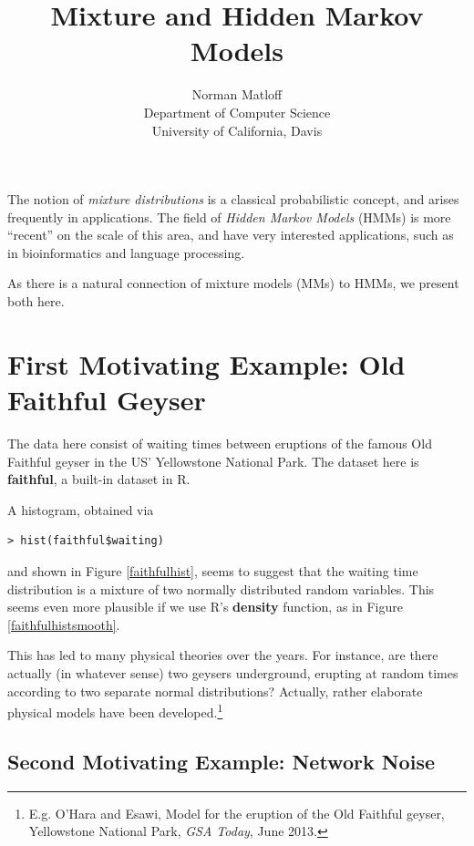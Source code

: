 \documentclass[11pt]{article}
\begin{document}
 

\title{Mixture and Hidden Markov Models}
\author{Norman Matloff \\
   Department of Computer Science \\
   University of California, Davis}

\maketitle

The notion of \textit{mixture distributions} is a classical
probabilistic concept, and arises frequently in applications.  The field
of \textit{Hidden Markov Models} (HMMs) is more ``recent'' on the scale
of this area, and have very interested applications, such as in
bioinformatics and language processing.

As there is a natural connection of mixture models (MMs) to HMMs, we
present both here.  

\section{First Motivating Example:  Old Faithful Geyser}

The data here consist of waiting times between eruptions of the famous
Old Faithful geyser in the US' Yellowstone National Park.  The dataset
here is \textbf{faithful}, a built-in dataset in R.

A histogram, obtained via 

\begin{lstlisting}
> hist(faithful$waiting)
\end{lstlisting}

and shown in Figure \ref{faithfulhist}, seems to suggest that the
waiting time distribution is a mixture of two normally distributed random
variables.  This seems even more plausible if we use R's
\textbf{density} function, as in Figure \ref{faithfulhistsmooth}.

This has led to many physical theories over the years.  For instance,
are there actually (in whatever sense) two geysers underground, erupting 
at random times according to two separate normal distributions?
Actually, rather elaborate physical models have been
developed.\footnote{E.g. O'Hara and Esawi, 
Model for the eruption of the Old Faithful geyser, Yellowstone National
Park, \textit{GSA Today}, June 2013.} 

\subsection{Second Motivating Example:  Network Noise}
\end{document}
